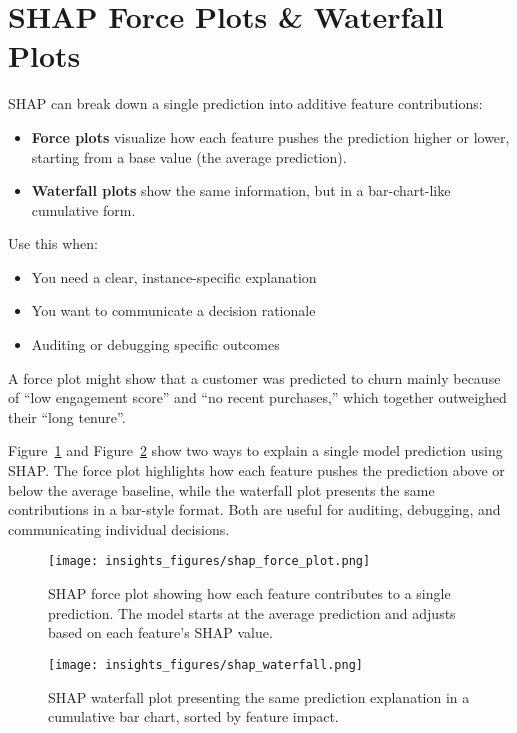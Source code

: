\documentclass[12pt,openany]{book}
\begin{document}
\section{SHAP Force Plots \& Waterfall Plots}

SHAP can break down a single prediction into additive feature contributions:
\begin{itemize}
  \item \textbf{Force plots} visualize how each feature pushes the prediction higher or lower, starting from a base value (the average prediction).
  \item \textbf{Waterfall plots} show the same information, but in a bar-chart-like cumulative form.
\end{itemize}

Use this when:
\begin{itemize}
  \item You need a clear, instance-specific explanation
  \item You want to communicate a decision rationale
  \item Auditing or debugging specific outcomes
\end{itemize}

\begin{examplebox}
A force plot might show that a customer was predicted to churn mainly because of ``low engagement score'' and ``no recent purchases,'' which together outweighed their ``long tenure''.
\end{examplebox}

Figure~\ref{fig:shap-force} and Figure~\ref{fig:shap-waterfall} show two ways to explain a single model prediction using SHAP. The force plot highlights how each feature pushes the prediction above or below the average baseline, while the waterfall plot presents the same contributions in a bar-style format. Both are useful for auditing, debugging, and communicating individual decisions.

\begin{figure}[H]
    \centering
    \texttt{[image: insights\_figures/shap\_force\_plot.png]}
    \caption{SHAP force plot showing how each feature contributes to a single prediction. The model starts at the average prediction and adjusts based on each feature’s SHAP value.}
    \label{fig:shap-force}
\end{figure}

\begin{figure}[H]
    \centering
    \texttt{[image: insights\_figures/shap\_waterfall.png]}
    \caption{SHAP waterfall plot presenting the same prediction explanation in a cumulative bar chart, sorted by feature impact.}
    \label{fig:shap-waterfall}
\end{figure}
\end{document}
